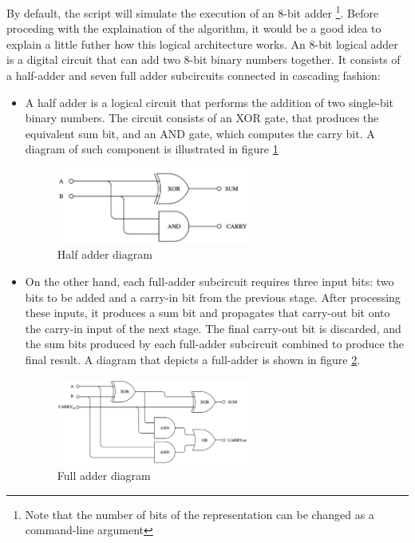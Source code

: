 \documentclass[12pt]{article}
\begin{document}
By default, the script will simulate the execution of an 8-bit adder \footnote{Note that the number of bits of the representation can be changed as a command-line argument}. Before proceding with the explaination of the algorithm, it would be a good idea to explain a little futher how this logical architecture works.
An 8-bit logical adder is a digital circuit that can add two 8-bit binary numbers together. It consists of a half-adder and seven full adder subcircuits connected in cascading fashion:
\begin{itemize}
  \item A half adder is a logical circuit that performs the addition of two single-bit binary numbers. The circuit consists of an XOR gate, that produces the equivalent sum bit, and an AND gate, which computes the carry bit. A diagram of such component is illustrated in figure \ref{fig:halfadder}

  \begin{figure}[h]
    \centering
    \includegraphics[width=0.6\textwidth]{halfadder.png}
    \caption{Half adder diagram}\label{fig:halfadder}
  \end{figure}
  
  \item On the other hand, each full-adder subcircuit requires three input bits: two bits to be added and a carry-in bit from the previous stage. After processing these inputs, it produces a sum bit and propagates that carry-out bit onto the carry-in input of the next stage. The final carry-out bit is discarded, and the sum bits produced by each full-adder subcircuit combined to produce the final result. A diagram that depicts a full-adder is shown in figure \ref{fig:fulladder}.

  \begin{figure}[h]
    \centering
    \includegraphics[width=0.6\textwidth]{fulladder.png}
    \caption{Full adder diagram}\label{fig:fulladder}
  \end{figure}
\end{itemize}
\end{document}
